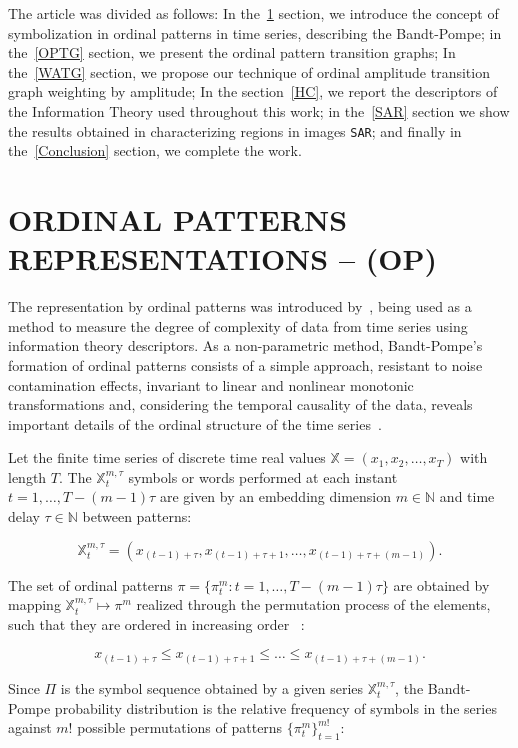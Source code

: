 \documentclass{isprs}
\begin{document}
The article was divided as follows:
In the~\ref{OP} section, we introduce the concept of symbolization in ordinal patterns in time series, describing the Bandt-Pompe;
in the~\ref{OPTG} section, we present the ordinal pattern transition graphs;
In the~\ref{WATG} section, we propose our technique of ordinal amplitude transition graph weighting by amplitude;
In the section~\ref{HC}, we report the descriptors of the Information Theory used throughout this work;
in the~\ref{SAR} section we show the results obtained in characterizing regions in images \texttt{SAR};
and finally in the~\ref{Conclusion} section, we complete the work.
	
\section{ORDINAL PATTERNS REPRESENTATIONS -- (OP)}\label{OP}

The representation by ordinal patterns was introduced by~\cite{Bandt2002Permutation}, being used as a method to measure the degree of complexity of data from time series using information theory descriptors.
As a non-parametric method, Bandt-Pompe's formation of ordinal patterns consists of a simple approach, resistant to noise contamination effects, invariant to linear and nonlinear monotonic transformations and, considering the temporal causality of the data, reveals important details of the ordinal structure of the time series~\citep{Larrondo2006Random}.
	
Let the finite time series of discrete time real values $\mathbb{X} = (x_1, x_2, \dots, x_T)$ with length $T$.
The $\mathbb{X}_t^{m, \tau} $ symbols or words performed at each instant $t = 1, \dots, T- (m-1) \tau$ are given by an embedding dimension $m \in \mathbb{N}$ and time delay $\tau \in \mathbb{N}$ between patterns:
	
\begin{equation}
	\mathbb{X}_t^{m,\tau} = (x_{(t-1)+\tau}, x_{(t-1)+\tau+1},\ldots, x_{(t-1)+\tau+(m-1)}).
\end{equation}
	
The set of ordinal patterns $\pi = \{\pi_t^m: t = 1, \dots, T- (m-1) \tau \}$ are obtained by mapping $\mathbb{X}^{m, \tau}_t \mapsto \pi^m$ realized through the permutation process of the elements, such that they are ordered in increasing order ~\citep{Ravetti2014noise}:

$$x_{(t-1) + \tau} \leq x_{(t-1) + \tau + 1} \leq \dots \leq x_{(t-1) + \tau + (m-1)}.$$
	
Since $\Pi$ is the symbol sequence obtained by a given series $\mathbb{X}_t^{m,\tau}$, the Bandt-Pompe probability distribution is the relative frequency of symbols in the series against $m!$ possible permutations of patterns $\{\pi_t^m \}_{t = 1}^{m!}$:
\end{document}

